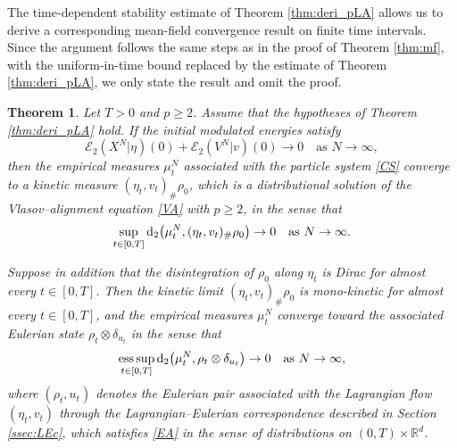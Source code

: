 \documentclass[10pt,reqno]{amsart}
\DeclareMathOperator*{\esssup}{ess\,sup}
\renewcommand{\geq}{\geqslant}
\renewcommand{\ge}{\geqslant}
\numberwithin{equation}{section}
\newtheorem{theorem}{Theorem}[section]
\newcommand{\R}{\mathbb R}
\newcommand{\rd}{\textnormal{d}}
\begin{document}
The time-dependent stability estimate of Theorem \ref{thm:deri_pLA} allows us to derive a corresponding mean-field convergence result on finite time intervals. Since the argument follows the same steps as in the proof of Theorem \ref{thm:mf}, with the uniform-in-time bound replaced by the estimate of Theorem \ref{thm:deri_pLA}, we only state the result and omit the proof.

 \begin{theorem}%
Let $T>0$ and $p\geq 2$. Assume that the hypotheses of Theorem \ref{thm:deri_pLA} hold. If the initial modulated energies satisfy
\[
\mathscr{E}_2(X^N|\eta)(0)+\mathscr{E}_2(V^N|v)(0)\to 0\quad\text{as }N\to\infty,
\]
then the empirical measures $\mu_t^N$ associated with the particle system \eqref{CS} converge to a kinetic measure $(\eta_t,v_t)_\#\rho_0$, which is a distributional solution of the Vlasov--alignment equation \eqref{VA} with $p\ge2$, in the sense that
\[
\sup_{t \in [0,T]}
\rd_2 \bigl(\mu_t^N,(\eta_t,v_t)_\#\rho_0\bigr)
\to 0\quad\text{as }N\to\infty.
\]

Suppose in addition that the disintegration of $\rho_0$ along $\eta_t$ is Dirac for almost every $t \in [0,T]$. Then the kinetic limit $(\eta_t,v_t)_\#\rho_0$ is mono-kinetic for almost every $t\in[0,T]$, and the empirical measures $\mu_t^N$ converge toward the associated Eulerian state $\rho_t\otimes\delta_{u_t}$ in the sense that
\[
\esssup_{t \in [0,T]} \rd_2 \bigl(\mu_t^N, \rho_t\otimes\delta_{u_t}\bigr) \to 0\quad\text{as }N\to\infty,
\]
where $(\rho_t,u_t)$ denotes the Eulerian pair associated with the Lagrangian flow $(\eta_t,v_t)$ through the Lagrangian--Eulerian correspondence described in Section \ref{ssec:LEc}, which satisfies \eqref{EA} in the sense of distributions on $(0,T)\times\R^d$.
\end{theorem}
 


%
%
%
%
 






%
%
%
%
%
%
%
%
%
%
%
 

 
 
\end{document}
